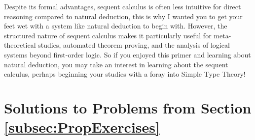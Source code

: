 Despite its formal advantages, sequent calculus is often less intuitive for direct reasoning compared to natural deduction, this is why I wanted you to get your feet wet with a system like 
natural deduction to begin with. However, the structured nature of sequent calculus makes it particularly useful for meta-theoretical studies, automated theorem proving, and the analysis 
of logical systems beyond first-order logic. So if you enjoyed this primer and learning about natural deduction, you may take an interest in learning about the sequent calculus, perhaps beginning 
your studies with a foray into Simple Type Theory!
\newpage

\section{Solutions to Problems from Section \ref{subsec:PropExercises}}
